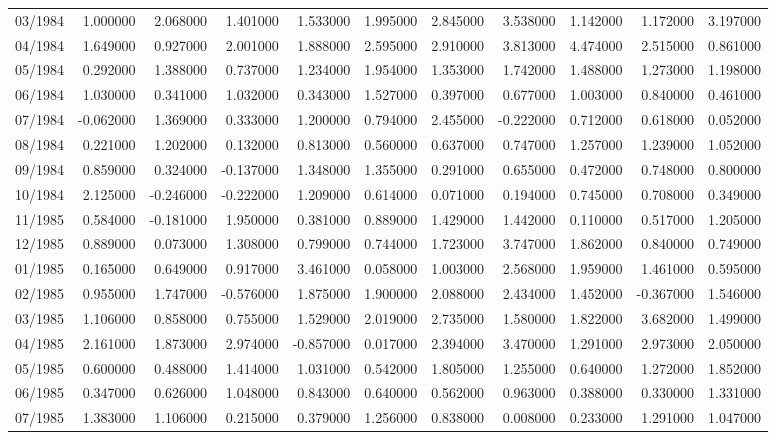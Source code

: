 \begin{tabular}{lrrrrrrrrrr}
03/1984 & 1.000000 & 2.068000 & 1.401000 & 1.533000 & 1.995000 & 2.845000 & 3.538000 & 1.142000 & 1.172000 & 3.197000 \\
04/1984 & 1.649000 & 0.927000 & 2.001000 & 1.888000 & 2.595000 & 2.910000 & 3.813000 & 4.474000 & 2.515000 & 0.861000 \\
05/1984 & 0.292000 & 1.388000 & 0.737000 & 1.234000 & 1.954000 & 1.353000 & 1.742000 & 1.488000 & 1.273000 & 1.198000 \\
06/1984 & 1.030000 & 0.341000 & 1.032000 & 0.343000 & 1.527000 & 0.397000 & 0.677000 & 1.003000 & 0.840000 & 0.461000 \\
07/1984 & -0.062000 & 1.369000 & 0.333000 & 1.200000 & 0.794000 & 2.455000 & -0.222000 & 0.712000 & 0.618000 & 0.052000 \\
08/1984 & 0.221000 & 1.202000 & 0.132000 & 0.813000 & 0.560000 & 0.637000 & 0.747000 & 1.257000 & 1.239000 & 1.052000 \\
09/1984 & 0.859000 & 0.324000 & -0.137000 & 1.348000 & 1.355000 & 0.291000 & 0.655000 & 0.472000 & 0.748000 & 0.800000 \\
10/1984 & 2.125000 & -0.246000 & -0.222000 & 1.209000 & 0.614000 & 0.071000 & 0.194000 & 0.745000 & 0.708000 & 0.349000 \\
11/1985 & 0.584000 & -0.181000 & 1.950000 & 0.381000 & 0.889000 & 1.429000 & 1.442000 & 0.110000 & 0.517000 & 1.205000 \\
12/1985 & 0.889000 & 0.073000 & 1.308000 & 0.799000 & 0.744000 & 1.723000 & 3.747000 & 1.862000 & 0.840000 & 0.749000 \\
01/1985 & 0.165000 & 0.649000 & 0.917000 & 3.461000 & 0.058000 & 1.003000 & 2.568000 & 1.959000 & 1.461000 & 0.595000 \\
02/1985 & 0.955000 & 1.747000 & -0.576000 & 1.875000 & 1.900000 & 2.088000 & 2.434000 & 1.452000 & -0.367000 & 1.546000 \\
03/1985 & 1.106000 & 0.858000 & 0.755000 & 1.529000 & 2.019000 & 2.735000 & 1.580000 & 1.822000 & 3.682000 & 1.499000 \\
04/1985 & 2.161000 & 1.873000 & 2.974000 & -0.857000 & 0.017000 & 2.394000 & 3.470000 & 1.291000 & 2.973000 & 2.050000 \\
05/1985 & 0.600000 & 0.488000 & 1.414000 & 1.031000 & 0.542000 & 1.805000 & 1.255000 & 0.640000 & 1.272000 & 1.852000 \\
06/1985 & 0.347000 & 0.626000 & 1.048000 & 0.843000 & 0.640000 & 0.562000 & 0.963000 & 0.388000 & 0.330000 & 1.331000 \\
07/1985 & 1.383000 & 1.106000 & 0.215000 & 0.379000 & 1.256000 & 0.838000 & 0.008000 & 0.233000 & 1.291000 & 1.047000 \\

\end{tabular}
